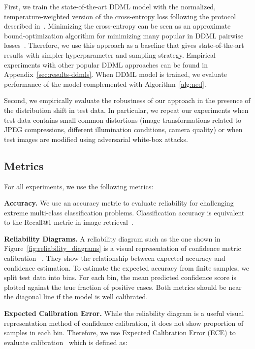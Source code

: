 \documentclass{article}
\begin{document}
First, we train the state-of-the-art DDML model with the normalized, temperature-weighted version of the cross-entropy loss following the protocol described in~\cite{b73}. Minimizing the cross-entropy can be seen as an approximate bound-optimization algorithm for minimizing many popular in DDML pairwise losses~\cite{ddml_deep_face_recognition, ddml_multi_similarity, ddml_scalable_nca, tripletloss, hierarchical_triplet, contrastiveloss}. Therefore, we use this approach as a baseline that gives state-of-the-art results with simpler hyperparameter and sampling strategy. Empirical experiments with other popular DDML approaches can be found in Appendix~\ref{sec:results-ddmls}.
When DDML model is trained, we evaluate performance of the model complemented with Algorithm~\ref{alg:ned}.

Second, we empirically evaluate the robustness of our approach in the presence of the distribution shift in test data. In particular, we repeat our experiments when test data contains small common distortions (image transformations related to JPEG compressions, different illumination conditions, camera quality) or when test images are modified using adversarial white-box attacks.

\subsection{Metrics}
For all experiments, we use the following metrics:

\textbf{Accuracy.} We use an accuracy metric to evaluate reliability for challenging extreme multi-class classification problems. Classification accuracy is equivalent to the Recall@1 metric in image retrieval~\cite{b3}.

\textbf{Reliability Diagrams.} A reliability diagram such as the one shown in Figure~\ref{fig:reliability_diagrams}
is a visual representation of confidence metric calibration ~\cite{b72}.
They show the relationship between expected accuracy and confidence estimation.
To estimate the expected accuracy from finite samples, we split test data into  bins. For each bin, the mean predicted confidence score is plotted against the true fraction of positive cases. Both metrics should be near the diagonal line if the model is well calibrated.

\textbf{Expected Calibration Error.} While the reliability diagram is a useful visual representation method of confidence calibration,
it does not show proportion of samples in each bin. Therefore, we use Expected Calibration Error (ECE) to evaluate calibration~\cite{b68} which is defined as:
\end{document}
